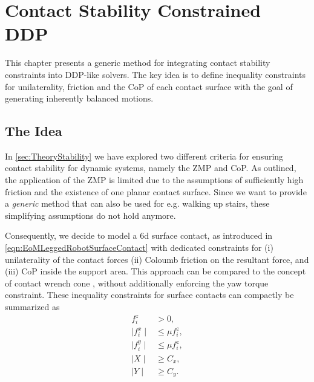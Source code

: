 
\chapter{Contact Stability Constrained DDP}\label{c3}
This chapter presents a generic method for integrating contact stability constraints into DDP-like solvers. The key idea is to define inequality constraints for unilaterality, friction and the \gls{CoP} of each contact surface with the goal of generating inherently balanced motions.
 
\section{The Idea}
In \cref{sec:TheoryStability} we have explored two different criteria for ensuring contact stability for dynamic systems, namely the \gls{ZMP} and \gls{CoP}. As outlined, the application of the \gls{ZMP} is limited due to the assumptions of sufficiently high friction and the existence of one planar contact surface. Since we want to provide a \textit{generic} method that can also be used for e.g. walking up stairs, these simplifying assumptions do not hold anymore. 

Consequently, we decide to model a 6d surface contact, as introduced in \ref{eqn:EoMLeggedRobotSurfaceContact} with dedicated constraints for (i) unilaterality of the contact forces (ii) Coloumb friction on the resultant force, and (iii) \gls{CoP} inside the support area. This approach can be compared to the concept of contact wrench cone \cite{caron2015stability}, without additionally enforcing the yaw torque constraint. These inequality constraints for surface contacts can compactly be summarized as
\begin{subequations}\label{eqn:contractWrenchConeReduced}
\begin{align}
f_i^z &> 0 \label{subeqn:stabilityUnilaterality},\\
\mid f_i^x\mid &\leq \mu f_i^z \label{subeqn:stabilityFrictionX},\\
\mid f_i^y\mid &\leq \mu f_i^z \label{subeqn:stabilityFrictionY},\\
\mid X\mid & \geq C_x \label{subeqn:stabilityCoPPitch},\\
\mid Y\mid & \geq C_y \label{subeqn:stabilityCoPRoll}.
\end{align}
\end{subequations}


